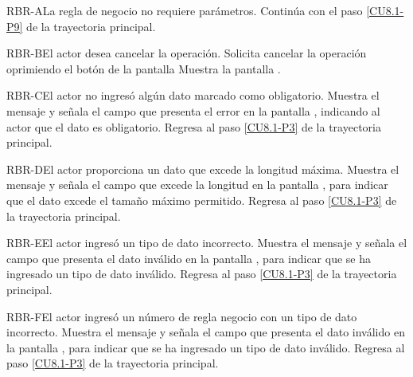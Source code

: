 	\begin{UCtrayectoriaA}{RBR-A}{La regla de negocio no requiere parámetros.}
		\UCpaso[\UCactor] Continúa con el paso \ref{CU8.1-P9} de la trayectoria principal.
	\end{UCtrayectoriaA}
	
	
	\begin{UCtrayectoriaA}{RBR-B}{El actor desea cancelar la operación.}
		\UCpaso[\UCactor] Solicita cancelar la operación oprimiendo el botón  de la pantalla 
		\UCpaso[\UCsist] Muestra la pantalla .
	\end{UCtrayectoriaA}

	\begin{UCtrayectoriaA}{RBR-C}{El actor no ingresó algún dato marcado como obligatorio.}
		\UCpaso[\UCsist] Muestra el mensaje  y señala el campo que presenta el error en la pantalla , indicando al actor que el dato es obligatorio.
		\UCpaso Regresa al paso \ref{CU8.1-P3} de la trayectoria principal.
	\end{UCtrayectoriaA}

	\begin{UCtrayectoriaA}{RBR-D}{El actor proporciona un dato que excede la longitud máxima.}
		\UCpaso[\UCsist] Muestra el mensaje  y señala el campo que excede la longitud en la pantalla , para indicar que el dato excede el tamaño máximo permitido.
		\UCpaso Regresa al paso \ref{CU8.1-P3} de la trayectoria principal.
	\end{UCtrayectoriaA}
	
	\begin{UCtrayectoriaA}{RBR-E}{El actor ingresó un tipo de dato incorrecto.}
		\UCpaso[\UCsist] Muestra el mensaje  y señala el campo que presenta el dato inválido en la pantalla , para indicar que se ha ingresado un tipo de dato inválido.
		\UCpaso Regresa al paso \ref{CU8.1-P3} de la trayectoria principal.
	\end{UCtrayectoriaA}

	\begin{UCtrayectoriaA}{RBR-F}{El actor ingresó un número de regla negocio con un tipo de dato incorrecto.}
		\UCpaso[\UCsist] Muestra el mensaje  y señala el campo que presenta el dato inválido en la pantalla , para indicar que se ha ingresado un tipo de dato inválido.
		\UCpaso Regresa al paso \ref{CU8.1-P3} de la trayectoria principal.
	\end{UCtrayectoriaA}

